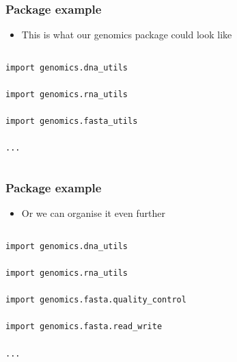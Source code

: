 \documentclass[xcolor=table]{beamer}
\begin{document}
\begin{frame}[fragile]
\frametitle{Package example}

\begin{itemize}
	\item This is what our genomics package could look like
\end{itemize}

\begin{columns}


\begin{lstlisting}[style=python]
import genomics.dna_utils

import genomics.rna_utils

import genomics.fasta_utils

...
\end{lstlisting}
\end{columns}

\end{frame}

\begin{frame}[fragile]
\frametitle{Package example}

\begin{itemize}
	\item Or we can organise it even further
\end{itemize}


\begin{columns}


\begin{lstlisting}[style=python]
import genomics.dna_utils

import genomics.rna_utils

import genomics.fasta.quality_control

import genomics.fasta.read_write

...
\end{lstlisting}
\end{columns}

\end{frame}
\end{document}
